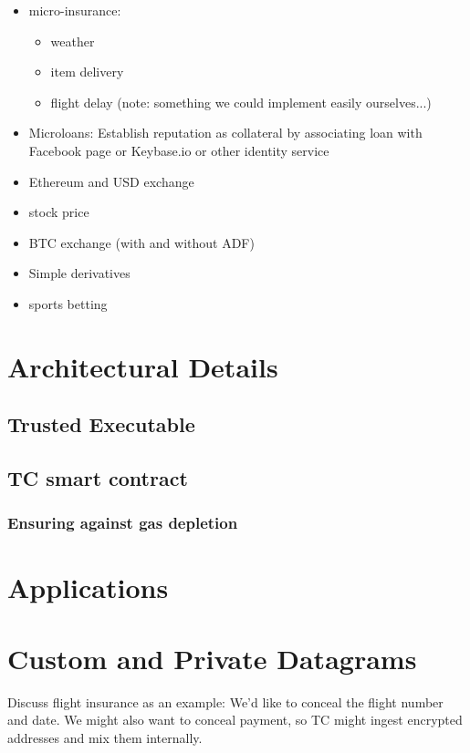 \documentclass[letterpaper,twocolumn,10pt]{article}
\begin{document}
\begin{itemize}
\item micro-insurance:
    \begin{itemize}
    \item weather
    \item item delivery
    \item flight delay (note: something we could implement easily ourselves...)
    \end{itemize}
\item Microloans: Establish reputation as collateral by associating loan with Facebook page or Keybase.io or other identity service
\item Ethereum and USD exchange
\item stock price
\item BTC exchange (with and without ADF)
\item Simple derivatives
\item sports betting
\end{itemize}

\section{Architectural Details}
\subsection{Trusted Executable}
\subsection{TC smart contract}
\subsubsection{Ensuring against gas depletion}

\section{Applications}

\section{Custom and Private Datagrams}

Discuss flight insurance as an example: We'd like to conceal the flight number and date. We might also want to conceal payment, so TC might ingest encrypted addresses and mix them internally.
\end{document}
